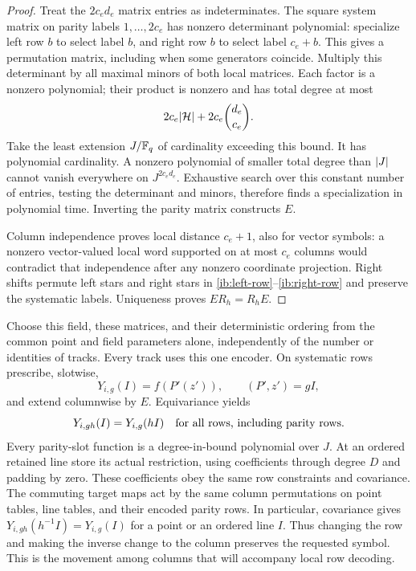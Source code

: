 \begin{proof}
Treat the \(2c_ed_e\) matrix entries as indeterminates.  The square
system matrix on parity labels \(1,\ldots,2c_e\) has nonzero
determinant polynomial: specialize left row \(b\) to select label
\(b\), and right row \(b\) to select label \(c_e+b\).  This gives
a permutation matrix, including when some generators coincide.
Multiply this determinant by all maximal minors of both local
matrices.  Each factor is a nonzero polynomial; their product is
nonzero and has total degree at most
\[
 2c_e\lvert \mathcal H\rvert
     +2c_e\binom{d_e}{c_e}.
\]
Take the least extension \(J/\mathbb{F}_q\) of cardinality exceeding this
bound.  It has polynomial cardinality.  A nonzero polynomial of
smaller total degree than \(\lvert J\rvert\) cannot vanish everywhere on
\(J^{2c_ed_e}\).  Exhaustive search over this constant number of
entries, testing the determinant and minors, therefore finds a
specialization in polynomial time.  Inverting the parity matrix
constructs \(E\).

Column independence proves local distance \(c_e+1\), also for
vector symbols: a nonzero vector-valued local word supported on at
most \(c_e\) columns would contradict that independence after any
nonzero coordinate projection.  Right shifts permute left stars
and right stars in \eqref{ib:left-row}--\eqref{ib:right-row} and
preserve the systematic labels.  Uniqueness proves \(ER_h=R_hE\).
\end{proof}

Choose this field, these matrices, and their deterministic ordering
from the common point and field parameters alone, independently of
the number or identities of tracks.  Every track uses this one
encoder.  On systematic rows prescribe, slotwise,
\[
 Y_{i,g}(I)=f(P'(z')),\qquad (P',z')=gI,
\]
and extend columnwise by \(E\).  Equivariance yields
\begin{equation}
 Y_{i,gh}(I)=Y_{i,g}(hI)
 \quad\hbox{for all rows, including parity rows.}
 \label{ib:covariance}
\end{equation}
Every parity-slot function is a degree-in-bound polynomial over
\(J\).  At an ordered retained line store its actual restriction,
using coefficients through degree \(D\) and padding by zero.
These coefficients obey the same row constraints and covariance.
The commuting target maps act by the same column permutations on
point tables, line tables, and their encoded parity rows.
In particular, covariance gives
\(Y_{i,gh}(h^{-1}I)=Y_{i,g}(I)\) for a point or an ordered line \(I\).
Thus changing the row and making the inverse change to the column
preserves the requested symbol. This is the movement among columns that
will accompany local row decoding.

